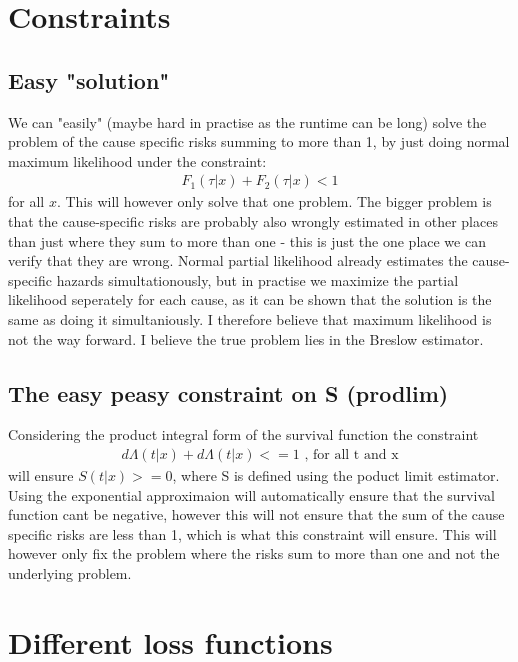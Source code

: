 \documentclass[11pt]{article}
\begin{document}
\section{Constraints}
\label{sec:org1d2aa59}

\subsection{Easy "solution"}
\label{sec:org24437f4}
We can "easily" (maybe hard in practise as the runtime can be long) solve the problem of the cause specific risks summing to more than 1, by just doing normal maximum likelihood under the constraint:
\begin{align}
F_1(\tau|x)+F_2(\tau|x)<1
\end{align}
for all \(x\). This will however only solve that one problem. The bigger problem is that the cause-specific risks are probably also wrongly estimated in other places than just where they sum to more than one - this is just the one place we can verify that they are wrong. Normal partial likelihood already estimates the cause-specific hazards simultationously, but in practise we maximize the partial likelihood seperately for each cause, as it can be shown that the solution is the same as doing it simultaniously. I therefore believe that maximum likelihood is not the way forward. I believe the true problem lies in the Breslow estimator.


\subsection{The easy peasy constraint on S (prodlim)}
\label{sec:orgf26f62b}
Considering the product integral form of the survival function the constraint
\begin{align*}
d\Lambda(t|x)+d\Lambda(t|x) <= 1\text{ , for all t and x}
\end{align*}
will ensure \(S(t|x)>= 0\), where S is defined using the poduct limit estimator. Using the exponential approximaion will automatically ensure that the survival function cant be negative, however this will not ensure that the sum of the cause specific risks are less than 1, which is what this constraint will ensure. This will however only fix the problem where the risks sum to more than one and not the underlying problem.

\section{Different loss functions}
\label{sec:org2bf7682}
\end{document}
